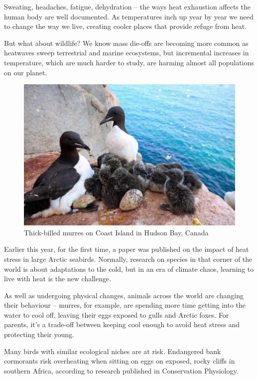 \documentclass[12pt]{article}
\begin{document}
Sweating, headaches, fatigue, dehydration – the ways heat exhaustion affects the human body are well documented. As temperatures inch up year by year we need to change the way we live, creating cooler places that provide refuge from heat.

But what about wildlife? We know mass die-offs are becoming more common as heatwaves sweep terrestrial and marine ecosystems, but incremental increases in temperature, which are much harder to study, are harming almost all populations on our planet.

\newpage
\begin{figure}
\includegraphics[scale=0.25]{graphic/seabirds.jpg}
\caption{Thick-billed murres on Coast Island in Hudson Bay, Canada}
\end{figure}
Earlier this year, for the first time, a paper was published on the impact of heat stress in large Arctic seabirds. Normally, research on species in that corner of the world is about adaptations to the cold, but in an era of climate chaos, learning to live with heat is the new challenge.

As well as undergoing physical changes, animals across the world are changing their behaviour – murres, for example, are spending more time getting into the water to cool off, leaving their eggs exposed to gulls and Arctic foxes. For parents, it’s a trade-off between keeping cool enough to avoid heat stress and protecting their young.

Many birds with similar ecological niches are at risk. Endangered bank cormorants risk overheating when sitting on eggs on exposed, rocky cliffs in southern Africa, according to research published in Conservation Physiology.
\end{document}
